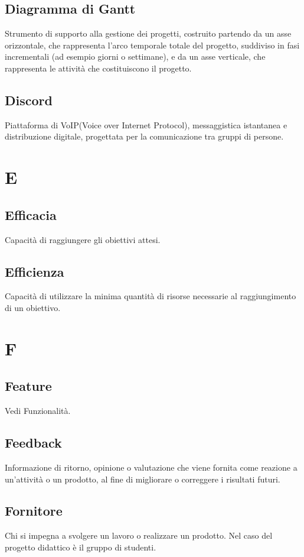     \subsection{Diagramma di Gantt}
    Strumento di supporto alla gestione dei progetti, costruito partendo da 
    un asse orizzontale, che rappresenta l'arco temporale totale del progetto, 
    suddiviso in fasi incrementali (ad esempio giorni o settimane), e da un asse 
    verticale, che rappresenta le attività che costituiscono il progetto.
    \subsection{Discord}
    Piattaforma di VoIP(Voice over Internet Protocol), messaggistica istantanea 
    e distribuzione digitale, progettata per la comunicazione tra gruppi di persone.
\section{E}
    \subsection{Efficacia}
    Capacità di raggiungere gli obiettivi attesi.
    \subsection{Efficienza}
    Capacità di utilizzare la minima quantità di risorse necessarie al raggiungimento
    di un obiettivo.
\section{F}
    \subsection{Feature}
    Vedi Funzionalità.
    \subsection{Feedback}
    Informazione di ritorno, opinione o valutazione che viene fornita come reazione a 
    un'attività o un prodotto, al fine di migliorare o correggere i risultati futuri.
    \subsection{Fornitore}
    Chi si impegna a svolgere un lavoro o realizzare un prodotto. Nel caso del progetto didattico
    è il gruppo di studenti.
